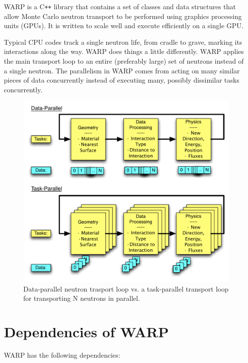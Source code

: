 \documentclass[twoside,a4paper]{refart}
\begin{document}
WARP is a C\texttt{++} library that contains a set of classes and data structures that allow Monte Carlo 
neutron transport to be performed using graphics processing units (GPUs).  It is written to scale well and
execute efficiently on a single GPU.

Typical CPU codes track a single neutron life, from cradle to grave, marking its interactions along the 
way. WARP does things a little differently.  WARP applies the main transport loop to an entire (preferably
large) set of neutrons instead of a single neutron.  The parallelism in WARP comes from acting on many 
similar pieces of data concurrently instead of executing many, possibly dissimilar tasks concurrently.

\begin{figure}[h!] 
  \centering
    \includegraphics[width=\textwidth]{graphics/datavtask.pdf}
     \caption{Data-parallel neutron trasport loop vs. a task-parallel transport loop for transporting N neutrons in parallel.  \label{datavtask} }
\end{figure}

\section{Dependencies of WARP}

WARP has the following dependencies:
\end{document}
